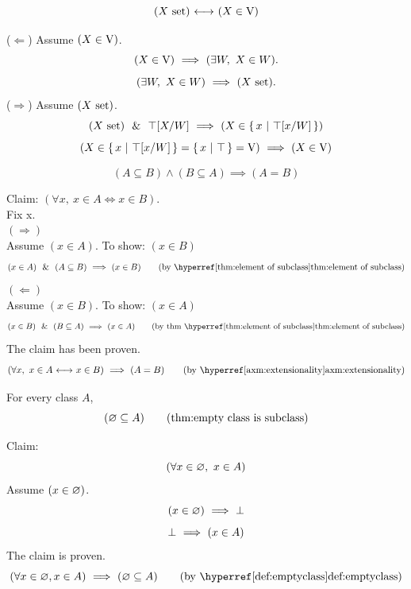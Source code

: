 \begin{theorem}
\[
(X\mathrm{\ set}){\ \longleftrightarrow\ }(X\in \mathrm{V})
\label{thm:sets are in V}
\]
\end{theorem}
\Proof
\noindent($\Leftarrow$) Assume $(X\in \mathrm{V})$.
\[
(X\in \mathrm{V})\ \Longrightarrow\ (\exists W,\ X\in W).
\]
\[
(\exists W,\ X\in W)\ \Longrightarrow\ (X\mathrm{\ set}).
\]
\noindent($\Rightarrow$) Assume $(X\mathrm{\ set})$.
\[
(X\mathrm{\ set})\ \ \&\ \ \top[X/W]\ \Longrightarrow\ (X\in \left\{\,x\ \middle|\ \top[x/W]\,\right\})
\]
\[
(X\in \left\{\,x\ \middle|\ \top[x/W]\,\right\}=\left\{\,x\ \middle|\ \top\,\right\}=\mathrm{V})\ \Longrightarrow\  (X\in \mathrm{V})
\]
\Done
\begin{theorem}
\[
(A \subseteq B)\land (B\subseteq A) \implies (A=B)
\]
\end{theorem}
\Proof
Claim: $(\forall x,\ x\in A \iff x\in B)$.\\
Fix x.\\
$(\Rightarrow)$\\
Assume $(x\in A)$. To show: $(x\in B)$
\[
(x\in A)
\LAND
(A\subseteq B)
\IMPLIES
(x\in B)
\tag{by \myref{thm:element of subclass}}
\]
$(\Leftarrow)$\\
Assume $(x\in B)$. To show: $(x\in A)$
\[
(x\in B)
\LAND
(B\subseteq A)
\IMPLIES
(x\in A)
\tag{by thm \myref{thm:element of subclass}}
\]
The claim has been proven.
\[
(\forall x,\ x\in A \iff x\in B)
\IMPLIES
(A=B)
\tag{by \myref{axm:extensionality}}
\]
\Done

\begin{theorem}
For every class $A$,
\[
(\emptyclass\subseteq A)
\clabeltagd{thm}{empty class is subclass}
\]
\end{theorem}
\Proof
Claim:
\[
(\forall x\in \varnothing,\  x\in A)
\]
Assume $(x\in\varnothing)$.
\[
(x\in\varnothing)
\ \Longrightarrow\ 
\bot
\]
\[
\bot
\ \Longrightarrow\ 
(x\in A)
\]
The claim is proven.
\[
(\forall x\in \emptyclass, x\in A)
\IMPLIES
(\emptyclass\subseteq A)
\tag{by \myref{def:emptyclass}}
\]
\Done

